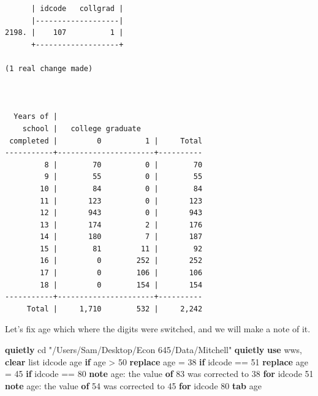 \documentclass[
]{book}
\newenvironment{Shaded}{\begin{snugshade}}{\end{snugshade}}
\newcommand{\KeywordTok}[1]{\textcolor[rgb]{0.13,0.29,0.53}{\textbf{#1}}}
\newcommand{\NormalTok}[1]{#1}
\newcommand{\OtherTok}[1]{\textcolor[rgb]{0.56,0.35,0.01}{#1}}
\newcommand{\StringTok}[1]{\textcolor[rgb]{0.31,0.60,0.02}{#1}}
\begin{document}
\begin{verbatim}
      | idcode   collgrad |
      |-------------------|
2198. |    107          1 |
      +-------------------+

(1 real change made)



  Years of |
    school |   college graduate
 completed |         0          1 |     Total
-----------+----------------------+----------
         8 |        70          0 |        70 
         9 |        55          0 |        55 
        10 |        84          0 |        84 
        11 |       123          0 |       123 
        12 |       943          0 |       943 
        13 |       174          2 |       176 
        14 |       180          7 |       187 
        15 |        81         11 |        92 
        16 |         0        252 |       252 
        17 |         0        106 |       106 
        18 |         0        154 |       154 
-----------+----------------------+----------
     Total |     1,710        532 |     2,242 
\end{verbatim}

Let's fix age which where the digits were switched, and we will make a note of it.

\begin{Shaded}
\begin{Highlighting}[]
\KeywordTok{quietly}\NormalTok{ cd }\StringTok{"/Users/Sam/Desktop/Econ 645/Data/Mitchell"}
\KeywordTok{quietly} \KeywordTok{use}\NormalTok{ wws, }\KeywordTok{clear}
\OtherTok{list}\NormalTok{ idcode age }\KeywordTok{if}\NormalTok{ age \textgreater{} 50}
\KeywordTok{replace}\NormalTok{ age = 38 }\KeywordTok{if}\NormalTok{ idcode == 51}
\KeywordTok{replace}\NormalTok{ age = 45 }\KeywordTok{if}\NormalTok{ idcode == 80}
\KeywordTok{note}\NormalTok{ age: the }\OtherTok{value} \KeywordTok{of}\NormalTok{ 83 was corrected to 38 }\KeywordTok{for}\NormalTok{ idcode 51}
\KeywordTok{note}\NormalTok{ age: the }\OtherTok{value} \KeywordTok{of}\NormalTok{ 54 was corrected to 45 }\KeywordTok{for}\NormalTok{ idcode 80}
\KeywordTok{tab}\NormalTok{ age}
\end{Highlighting}
\end{Shaded}
\end{document}
